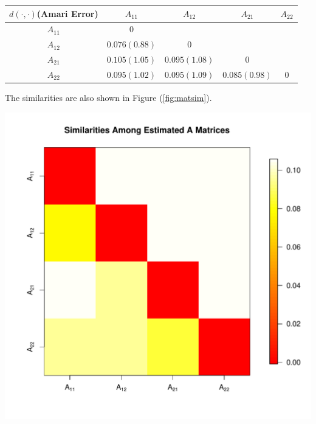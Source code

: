 \documentclass[fleqn]{article}
\let\oldref\ref
\renewcommand{\ref}[1]{(\oldref{#1})}
\begin{document}
\begin{table}
\centering
{}
\label{tab:similarity}
\begin{tabular}{c|cccc}
\hline
$d(\cdot,\cdot)$(Amari Error) & $A_{11}$&$A_{12}$ & $A_{21}$&$A_{22}$ \\
\hline
$A_{11}$ & $0$ &  &  &\\
$A_{12}$ & $\mathbf{0.076(0.88)}$& $0$ & &\\
$A_{21}$ & $0.105(1.05)$ & $0.095(1.08)$  & $0$ &\\
$A_{22}$ & $0.095(1.02)$ & $0.095(1.09)$ & $\mathbf{0.085(0.98)}$ & $0$ \\
\hline
\end{tabular}
\end{table}

The similarities are also shown in Figure \ref{fig:matsim}.
\begin{center}
\includegraphics[scale=.5]{./figures/A-matrices-similarity.pdf}
\label{fig:matsim}
\end{center}
\end{document}
